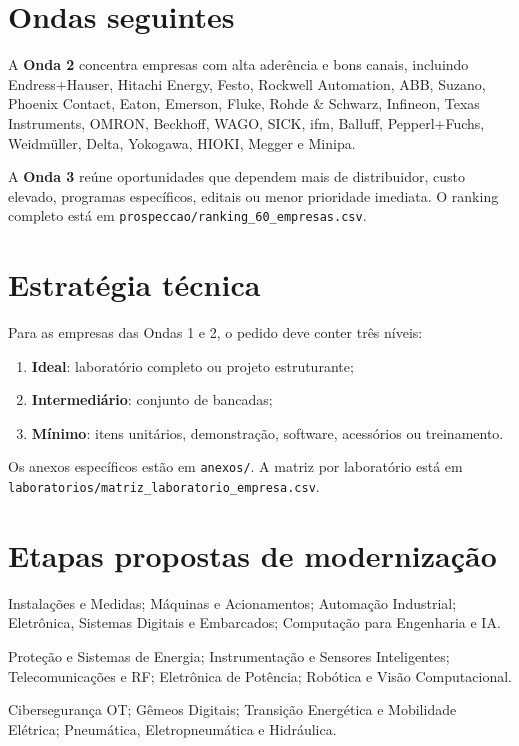 \documentclass[11pt,a4paper]{article}
\begin{document}
\section{Ondas seguintes}
A \textbf{Onda 2} concentra empresas com alta aderência e bons canais, incluindo Endress+Hauser, Hitachi Energy, Festo, Rockwell Automation, ABB, Suzano, Phoenix Contact, Eaton, Emerson, Fluke, Rohde \& Schwarz, Infineon, Texas Instruments, OMRON, Beckhoff, WAGO, SICK, ifm, Balluff, Pepperl+Fuchs, Weidmüller, Delta, Yokogawa, HIOKI, Megger e Minipa.

A \textbf{Onda 3} reúne oportunidades que dependem mais de distribuidor, custo elevado, programas específicos, editais ou menor prioridade imediata. O ranking completo está em \texttt{prospeccao/ranking\_60\_empresas.csv}.

\section{Estratégia técnica}
Para as empresas das Ondas 1 e 2, o pedido deve conter três níveis:
\begin{enumerate}[leftmargin=*]
\item \textbf{Ideal}: laboratório completo ou projeto estruturante;
\item \textbf{Intermediário}: conjunto de bancadas;
\item \textbf{Mínimo}: itens unitários, demonstração, software, acessórios ou treinamento.
\end{enumerate}

Os anexos específicos estão em \texttt{anexos/}. A matriz por laboratório está em \texttt{laboratorios/matriz\_laboratorio\_empresa.csv}.

\section{Etapas propostas de modernização}
\begin{description}[leftmargin=2.5cm,style=nextline]
\item[\textcolor{azulpetroleo}{Etapa 1 -- Máxima}]
Instalações e Medidas; Máquinas e Acionamentos; Automação Industrial; Eletrônica, Sistemas Digitais e Embarcados; Computação para Engenharia e IA.
\item[\textcolor{azulpetroleo}{Etapa 2 -- Alta}]
Proteção e Sistemas de Energia; Instrumentação e Sensores Inteligentes; Telecomunicações e RF; Eletrônica de Potência; Robótica e Visão Computacional.
\item[\textcolor{azulpetroleo}{Etapa 3 -- Estratégica}]
Cibersegurança OT; Gêmeos Digitais; Transição Energética e Mobilidade Elétrica; Pneumática, Eletropneumática e Hidráulica.
\end{description}
\end{document}

